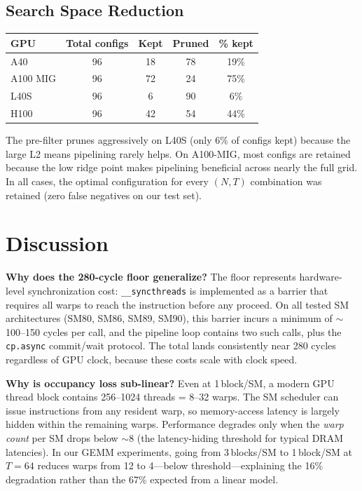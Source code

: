 \documentclass[sigplan,nonacm,10pt]{acmart}
\newcommand{\cpasync}{\texttt{cp.async}}
\begin{document}
\subsection{Search Space Reduction}

\begin{center}
\small
\renewcommand{\arraystretch}{1.2}
\begin{tabular}{@{}lcccc@{}}
\toprule
GPU & Total configs & Kept & Pruned & \% kept \\
\midrule
A40            & 96 & 18 & 78 & 19\% \\
A100 MIG       & 96 & 72 & 24 & 75\% \\
L40S           & 96 &  6 & 90 &  6\% \\
H100           & 96 & 42 & 54 & 44\% \\
\bottomrule
\end{tabular}
\end{center}

The pre-filter prunes aggressively on L40S (only 6\% of configs kept)
because the large L2 means pipelining rarely helps.
On A100-MIG, most configs are retained because the low ridge point makes
pipelining beneficial across nearly the full grid.
In all cases, the optimal configuration for every $(N, T)$ combination
was retained (zero false negatives on our test set).

\section{Discussion}
\label{sec:discussion}

\textbf{Why does the 280-cycle floor generalize?}
The floor represents hardware-level synchronization cost: \texttt{\_\_syncthreads}
is implemented as a barrier that requires all warps to reach the
instruction before any proceed.
On all tested SM architectures (SM80, SM86, SM89, SM90), this barrier
incurs a minimum of $\sim$100--150 cycles per call, and the pipeline
loop contains two such calls, plus the \cpasync{} commit/wait protocol.
The total lands consistently near 280 cycles regardless of GPU clock,
because these costs scale with clock speed.

\textbf{Why is occupancy loss sub-linear?}
Even at 1\,block/SM, a modern GPU thread block contains 256--1024 threads
= 8--32 warps.
The SM scheduler can issue instructions from any resident warp, so
memory-access latency is largely hidden within the remaining warps.
Performance degrades only when the \emph{warp count} per SM drops below
$\sim$8 (the latency-hiding threshold for typical DRAM latencies).
In our GEMM experiments, going from 3\,blocks/SM to 1\,block/SM at
$T=64$ reduces warps from 12 to 4---below threshold---explaining the
16\% degradation rather than the 67\% expected from a linear model.
\end{document}
